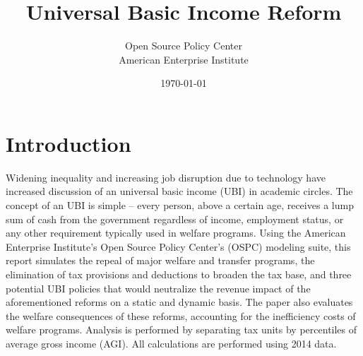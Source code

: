 \documentclass{article}
\begin{document}


\newcommand{\ospc}{\footnote{Author’s calculations using OSPC Tax-Calculator.}}

\begin{titlepage}

\title{Universal Basic Income Reform}
\author{Open Source Policy Center \\ American Enterprise Institute}
\date{\today}

\maketitle

\end{titlepage}

\tableofcontents
\newpage

\doublespacing

\section{Introduction}

Widening inequality and increasing job disruption due to technology have increased discussion of an universal basic income (UBI) in academic circles. The concept of an UBI is simple -- every person, above a certain age, receives a lump sum of cash from the government regardless of income, employment status, or any other requirement typically used in welfare programs. Using the American Enterprise Institute's Open Source Policy Center's (OSPC) modeling suite, this report simulates the repeal of major welfare and transfer programs, the elimination of tax provisions and deductions to broaden the tax base, and three potential UBI policies that would neutralize the revenue impact of the aforementioned reforms on a static and dynamic basis. The paper also evaluates the welfare consequences of these reforms, accounting for the inefficiency costs of welfare programs. Analysis is performed by separating tax units by percentiles of average gross income (AGI). All calculations are performed using 2014 data.

\end{document}
